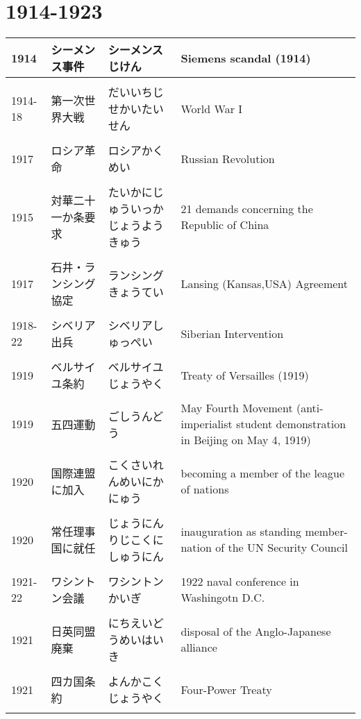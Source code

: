 \documentclass{article}
\begin{document}
\section{1914-1923}
\begin{tabular}{p{1.8cm} | p{3.4cm} | p{5.91cm} | p{7.0cm}}
1914 & シーメンス事件 & シーメンスじけん & Siemens scandal (1914) \\ \hline \\[-1em]
1914-18 & 第一次世界大戦 & だいいちじせかいたいせん & World War I \\ \hline \\[-1em]
1917 & ロシア革命 & ロシアかくめい & Russian Revolution \\ \hline \\[-1em]
1915 & 対華二十一か条要求 & たいかにじゅういっかじょうようきゅう & 21 demands concerning the Republic of China \\ \hline \\[-1em]
1917 & 石井・ランシング協定 & ランシングきょうてい & Lansing (Kansas,USA) Agreement \\ \hline \\[-1em]
1918-22 & シベリア出兵 & シベリアしゅっぺい & Siberian Intervention​ \\ \hline \\[-1em]
1919 & ベルサイユ条約 & ベルサイユじょうやく & Treaty of Versailles (1919)​ \\ \hline \\[-1em]
1919 & 五四運動 &  ごしうんどう & May Fourth Movement (anti-imperialist student demonstration in Beijing on May 4, 1919) \\ \hline \\[-1em]
1920 & 国際連盟に加入 & こくさいれんめいにかにゅう & becoming a member of the league of nations \\ \hline \\[-1em]
1920 & 常任理事国に就任 & じょうにんりじこくにしゅうにん & inauguration as standing member-nation of the UN Security Council \\ \hline \\[-1em]
1921-22 & ワシントン会議 & ワシントンかいぎ & 1922 naval conference in Washingotn D.C. \\ \hline \\[-1em]
1921 & 日英同盟廃棄& にちえいどうめいはいき & disposal of the Anglo-Japanese alliance \\ \hline \\[-1em]
1921 & 四カ国条約 & よんかこくじょうやく & Four-Power Treaty​ \\ \hline \\[-1em]

\end{tabular}
\end{document}
